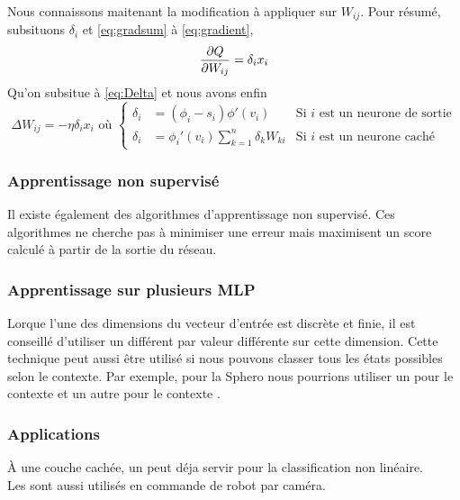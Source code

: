 Nous connaissons maitenant la modification à appliquer sur $W_{ij}$. Pour résumé, subsituons $\delta_i$ et \eqref{eq:gradsum} à \eqref{eq:gradient},
\begin{equation}\label{eq:subgradient}
 \frac{\partial Q}{\partial W_{ij}} = \delta_i x_i
\end{equation}
Qu'on subsitue à \eqref{eq:Delta} et nous avons enfin
\begin{equation}\label{eq:mlpretro}
 \Delta W_{ij} = -\eta \delta_i x_i \text{~où~}\left\{
  \begin{array}{lll}
   \delta_i & = (\phi_i - s_i)\phi'(v_i) & \text{Si~} i \text{~est un neurone de sortie}\\
   \delta_i & = \phi_i'(v_i) \sum_{k=1}^{n} \delta_k W_{ki} & \text{Si~} i \text{~est un neurone caché}
  \end{array}
 \right.
\end{equation}

\subsubsection{Apprentissage non supervisé}
Il existe également des algorithmes d'apprentissage non supervisé.
Ces algorithmes ne cherche pas à minimiser une erreur mais maximisent un score calculé à partir de la sortie du réseau.
\subsubsection{Apprentissage sur plusieurs MLP}
Lorque l'une des dimensions du vecteur d'entrée est discrète et finie, il est conseillé d'utiliser un \mlp différent par valeur différente sur cette dimension.\cite{Gauthier}
Cette technique peut aussi être utilisé si nous pouvons classer tous les états possibles selon le contexte.
Par exemple, pour la Sphero nous pourrions utiliser un \mlp pour le contexte  et un autre \mlp pour le contexte .
\subsubsection{Applications}
À une couche cachée, un \mlp peut déja servir pour la classification non linéaire.\cite{statistica}\\
Les \mlp sont aussi utilisés en commande de robot par caméra.\cite{Pomerleau}